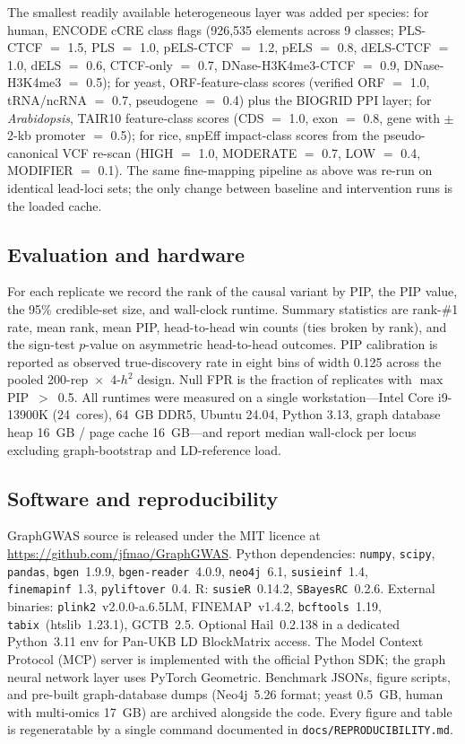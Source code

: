 The smallest readily available heterogeneous layer was added per
species: for human, ENCODE cCRE class flags (926{,}535 elements
across 9 classes; PLS-CTCF $=$ 1.5, PLS $=$ 1.0, pELS-CTCF $=$ 1.2,
pELS $=$ 0.8, dELS-CTCF $=$ 1.0, dELS $=$ 0.6, CTCF-only $=$ 0.7,
DNase-H3K4me3-CTCF $=$ 0.9, DNase-H3K4me3 $=$ 0.5);
for yeast, ORF-feature-class scores (verified ORF $=$ 1.0,
tRNA/ncRNA $=$ 0.7, pseudogene $=$ 0.4) plus the BIOGRID PPI layer;
for \emph{Arabidopsis}, TAIR10 feature-class scores
(CDS $=$ 1.0, exon $=$ 0.8, gene with $\pm$2-kb promoter $=$ 0.5);
for rice, snpEff impact-class scores from the pseudo-canonical
VCF re-scan (HIGH $=$ 1.0, MODERATE $=$ 0.7, LOW $=$ 0.4,
MODIFIER $=$ 0.1). The same fine-mapping pipeline as above was
re-run on identical lead-loci sets; the only change between
baseline and intervention runs is the loaded cache.

\subsection*{Evaluation and hardware}

For each replicate we record the rank of the causal variant by PIP,
the PIP value, the 95\% credible-set size, and wall-clock runtime.
Summary statistics are rank-\#1 rate, mean rank, mean PIP,
head-to-head win counts (ties broken by rank), and the sign-test
$p$-value on asymmetric head-to-head outcomes. PIP calibration is
reported as observed true-discovery rate in eight bins of width
0.125 across the pooled 200-rep~$\times$~4-$h^2$ design. Null FPR
is the fraction of replicates with $\max$\,PIP~$>$~0.5. All runtimes
were measured on a single workstation---Intel Core i9-13900K
(24~cores), 64~GB DDR5, Ubuntu 24.04, Python 3.13, graph database
heap 16~GB / page cache 16~GB---and report median wall-clock per locus
excluding graph-bootstrap and LD-reference load.

\subsection*{Software and reproducibility}

GraphGWAS source is released under the MIT licence at
\url{https://github.com/jfmao/GraphGWAS}. Python dependencies:
\texttt{numpy}\cite{harris2020numpy}, \texttt{scipy}\cite{virtanen2020scipy},
\texttt{pandas}, \texttt{bgen}~1.9.9, \texttt{bgen-reader}~4.0.9,
\texttt{neo4j}~6.1, \texttt{susieinf}~1.4, \texttt{finemapinf}~1.3,
\texttt{pyliftover}~0.4. R: \texttt{susieR}~0.14.2,
\texttt{SBayesRC}~0.2.6. External binaries:
\texttt{plink2}\cite{chang2015second}~v2.0.0-a.6.5LM, FINEMAP~v1.4.2,
\texttt{bcftools}\cite{danecek2021twelve}~1.19,
\texttt{tabix}\cite{li2011tabix}~(htslib~1.23.1), GCTB~2.5. Optional
Hail\cite{hailteam2024}~0.2.138 in a dedicated Python~3.11 env for
Pan-UKB LD BlockMatrix access. The Model Context Protocol (MCP)
server\cite{mcp2024} is implemented with the official Python SDK;
the graph neural network layer uses PyTorch
Geometric\cite{fey2019fast}.
Benchmark JSONs, figure scripts, and pre-built graph-database
dumps (Neo4j~5.26 format; yeast 0.5~GB, human with multi-omics
17~GB) are archived alongside the code. Every
figure and table is regeneratable by a single command documented in
\texttt{docs/REPRODUCIBILITY.md}.

